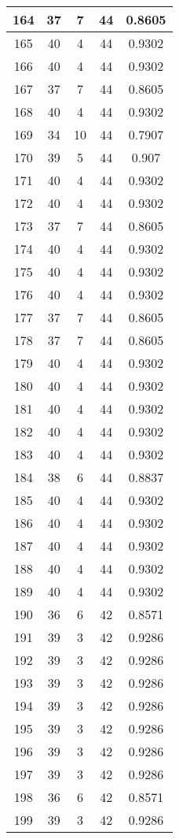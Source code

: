 \documentclass[letterpaper, 12pt]{article}
\begin{document}
\begin{longtable}{|c|c|c|c|c|}
\hline
164 & 37 & 7 & 44 & 0.8605 \\
\hline
165 & 40 & 4 & 44 & 0.9302 \\
\hline
166 & 40 & 4 & 44 & 0.9302 \\
\hline
167 & 37 & 7 & 44 & 0.8605 \\
\hline
168 & 40 & 4 & 44 & 0.9302 \\
\hline
169 & 34 & 10 & 44 & 0.7907 \\
\hline
170 & 39 & 5 & 44 & 0.907 \\
\hline
171 & 40 & 4 & 44 & 0.9302 \\
\hline
172 & 40 & 4 & 44 & 0.9302 \\
\hline
173 & 37 & 7 & 44 & 0.8605 \\
\hline
174 & 40 & 4 & 44 & 0.9302 \\
\hline
175 & 40 & 4 & 44 & 0.9302 \\
\hline
176 & 40 & 4 & 44 & 0.9302 \\
\hline
177 & 37 & 7 & 44 & 0.8605 \\
\hline
178 & 37 & 7 & 44 & 0.8605 \\
\hline
179 & 40 & 4 & 44 & 0.9302 \\
\hline
180 & 40 & 4 & 44 & 0.9302 \\
\hline
181 & 40 & 4 & 44 & 0.9302 \\
\hline
182 & 40 & 4 & 44 & 0.9302 \\
\hline
183 & 40 & 4 & 44 & 0.9302 \\
\hline
184 & 38 & 6 & 44 & 0.8837 \\
\hline
185 & 40 & 4 & 44 & 0.9302 \\
\hline
186 & 40 & 4 & 44 & 0.9302 \\
\hline
187 & 40 & 4 & 44 & 0.9302 \\
\hline
188 & 40 & 4 & 44 & 0.9302 \\
\hline
189 & 40 & 4 & 44 & 0.9302 \\
\hline
190 & 36 & 6 & 42 & 0.8571 \\
\hline
191 & 39 & 3 & 42 & 0.9286 \\
\hline
192 & 39 & 3 & 42 & 0.9286 \\
\hline
193 & 39 & 3 & 42 & 0.9286 \\
\hline
194 & 39 & 3 & 42 & 0.9286 \\
\hline
195 & 39 & 3 & 42 & 0.9286 \\
\hline
196 & 39 & 3 & 42 & 0.9286 \\
\hline
197 & 39 & 3 & 42 & 0.9286 \\
\hline
198 & 36 & 6 & 42 & 0.8571 \\
\hline
199 & 39 & 3 & 42 & 0.9286 \\
\hline
\end{longtable}
\end{document}

